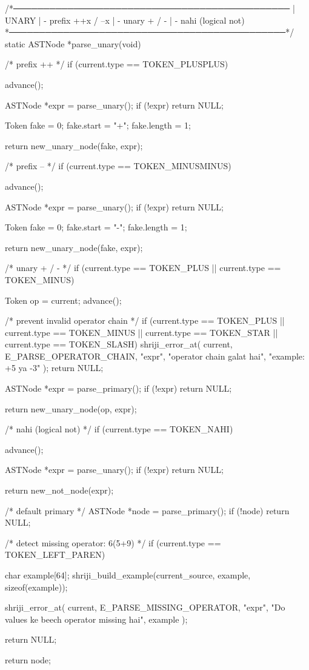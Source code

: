 \documentclass{article}
\begin{document}
/*──────────────────────────────────────────────
 | UNARY
 |   - prefix ++x / --x
 |   - unary + / -
 |   - nahi (logical not)
 *──────────────────────────────────────────────*/
static ASTNode *parse_unary(void)
{
    /* prefix ++ */
    if (current.type == TOKEN_PLUSPLUS) {
        advance();

        ASTNode *expr = parse_unary();
        if (!expr) return NULL;

        Token fake = {0};
        fake.start = "+";
        fake.length = 1;

        return new_unary_node(fake, expr);
    }

    /* prefix -- */
    if (current.type == TOKEN_MINUSMINUS) {
        advance();

        ASTNode *expr = parse_unary();
        if (!expr) return NULL;

        Token fake = {0};
        fake.start = "-";
        fake.length = 1;

        return new_unary_node(fake, expr);
    }

    /* unary + / - */
    if (current.type == TOKEN_PLUS || current.type == TOKEN_MINUS) {

        Token op = current;
        advance();

        /* prevent invalid operator chain */
        if (current.type == TOKEN_PLUS ||
            current.type == TOKEN_MINUS ||
            current.type == TOKEN_STAR ||
            current.type == TOKEN_SLASH)
        {
            shriji_error_at(
                current,
                E_PARSE_OPERATOR_CHAIN,
                "expr",
                "operator chain galat hai",
                "example: +5 ya -3"
            );
            return NULL;
        }

        ASTNode *expr = parse_primary();
        if (!expr) return NULL;

        return new_unary_node(op, expr);
    }

    /* nahi (logical not) */
    if (current.type == TOKEN_NAHI) {
        advance();

        ASTNode *expr = parse_unary();
        if (!expr) return NULL;

        return new_not_node(expr);
    }

    /* default primary */
    ASTNode *node = parse_primary();
    if (!node) return NULL;

    /* detect missing operator: 6(5+9) */
    if (current.type == TOKEN_LEFT_PAREN)
    {
        char example[64];
        shriji_build_example(current_source, example, sizeof(example));

        shriji_error_at(
            current,
            E_PARSE_MISSING_OPERATOR,
            "expr",
            "Do values ke beech operator missing hai",
            example
        );

        return NULL;
    }

    return node;
}
\end{document}
